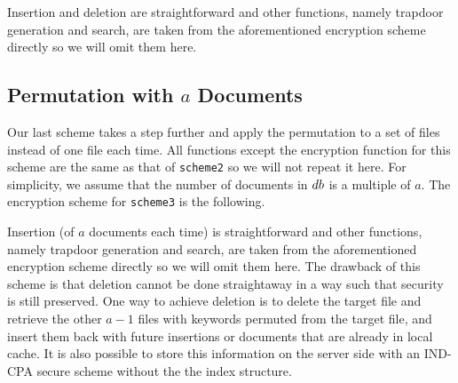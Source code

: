 Insertion and deletion are straightforward and other functions, namely trapdoor generation and search, are taken from the aforementioned encryption scheme directly so we will omit them here.




\subsection{Permutation with $a$ Documents}
Our last scheme takes a step further and apply the permutation to a set of files instead of one file each time. All functions except the encryption function for this scheme are the same as that of \texttt{scheme2} so we will not repeat it here. For simplicity, we assume that the number of documents in $db$ is a multiple of $a$. The encryption scheme for \texttt{scheme3} is the following.

\begin{pchstack}[center]
\end{pchstack}

Insertion (of $a$ documents each time) is straightforward and other functions, namely trapdoor generation and search, are taken from the aforementioned encryption scheme directly so we will omit them here. The drawback of this scheme is that deletion cannot be done straightaway in a way such that security is still preserved. One way to achieve deletion is to delete the target file and retrieve the other $a-1$ files with keywords permuted from the target file, and insert them back with future insertions or documents that are already in local cache. It is also possible to store this information on the server side with an IND-CPA secure scheme without the the index structure.





